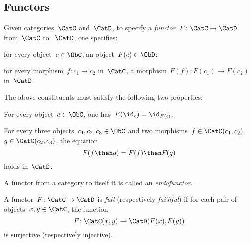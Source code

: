 \subsection{Functors}
\begin{shaded}
\begin{definition}[Functor]
\label{def:functor}
Given categories~$\CatC$ and~$\CatD$, to specify a \emph{functor}~$F\colon \CatC\to \CatD$ from~$\CatC$ to ~$\CatD$, one specifies:
\begin{compactenum}
    \item for every object~$c\in \ObC$, an object~$F(c)\in \ObD$;
    \item for every morphism~$f\colon c_1\to c_2$ in~$\CatC$, a morphism~$F(f)\colon F(c_1)\to F(c_2)$ in~$\CatD$.
\end{compactenum}
The above constituents must satisfy the following two properties:
\begin{compactenum}[(a)]
    \item For every object~$c\in \ObC$, one has~$F(\id_c)=\id_{F(c)}$.
    \item For every three objects~$c_1,c_2,c_3 \in \ObC$ and two morphisms~$f\in \CatC(c_1,c_2)$,~$g\in \CatC(c_2,c_3)$, the equation 
    \begin{equation}
        F(f\then g)=F(f)\then F(g)
    \end{equation}
holds in~$\CatD$.
\end{compactenum}
\end{definition}

\begin{remark}
A functor from a category to itself it is called an \emph{endofunctor}.
\end{remark}

\begin{definition}
\label{def:functorfullfaith}
A functor~$F\colon \CatC \to \CatD$ is \emph{full} (respectively \emph{faithful}) if for each pair of objects~$x,y\in \CatC$, the function
\begin{equation}
    F\colon \CatC(x,y)\to \CatD(F(x),F(y))
\end{equation}
is surjective (respectively injective).
\end{definition}
\end{shaded}

